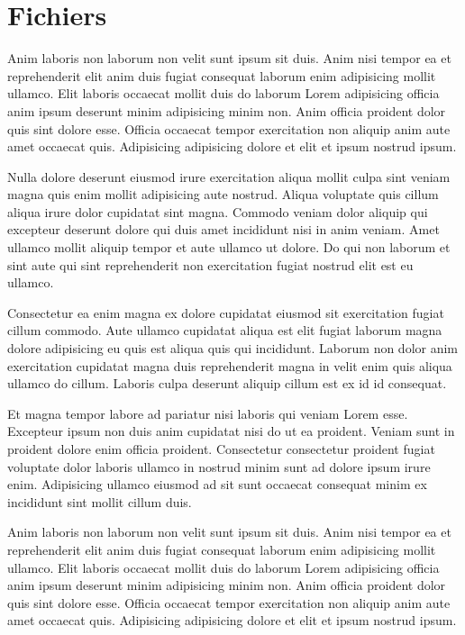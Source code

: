 \documentclass[a4paper,10pt,french]{sphinxmanual}
\begin{document}
\section{Fichiers }
\label{\detokenize{docs/refs/autocad-help:fichiers-pdf}}
Anim laboris non laborum non velit sunt ipsum sit duis. Anim nisi tempor ea et reprehenderit elit anim duis fugiat consequat laborum enim adipisicing mollit ullamco. Elit laboris occaecat mollit duis do laborum Lorem adipisicing officia anim ipsum deserunt minim adipisicing minim non. Anim officia proident dolor quis sint dolore esse. Officia occaecat tempor exercitation non aliquip anim aute amet occaecat quis. Adipisicing adipisicing dolore et elit et ipsum nostrud ipsum.

Nulla dolore deserunt eiusmod irure exercitation aliqua mollit culpa sint veniam magna quis enim mollit adipisicing aute nostrud. Aliqua voluptate quis cillum aliqua irure dolor cupidatat sint magna. Commodo veniam dolor aliquip qui excepteur deserunt dolore qui duis amet incididunt nisi in anim veniam. Amet ullamco mollit aliquip tempor et aute ullamco ut dolore. Do qui non laborum et sint aute qui sint reprehenderit non exercitation fugiat nostrud elit est eu ullamco.

Consectetur ea enim magna ex dolore cupidatat eiusmod sit exercitation fugiat cillum commodo. Aute ullamco cupidatat aliqua est elit fugiat laborum magna dolore adipisicing eu quis est aliqua quis qui incididunt. Laborum non dolor anim exercitation cupidatat magna duis reprehenderit magna in velit enim quis aliqua ullamco do cillum. Laboris culpa deserunt aliquip cillum est ex id id consequat.

Et magna tempor labore ad pariatur nisi laboris qui veniam Lorem esse. Excepteur ipsum non duis anim cupidatat nisi do ut ea proident. Veniam sunt in proident dolore enim officia proident. Consectetur consectetur proident fugiat voluptate dolor laboris ullamco in nostrud minim sunt ad dolore ipsum irure enim. Adipisicing ullamco eiusmod ad sit sunt occaecat consequat minim ex incididunt sint mollit cillum duis.

Anim laboris non laborum non velit sunt ipsum sit duis. Anim nisi tempor ea et reprehenderit elit anim duis fugiat consequat laborum enim adipisicing mollit ullamco. Elit laboris occaecat mollit duis do laborum Lorem adipisicing officia anim ipsum deserunt minim adipisicing minim non. Anim officia proident dolor quis sint dolore esse. Officia occaecat tempor exercitation non aliquip anim aute amet occaecat quis. Adipisicing adipisicing dolore et elit et ipsum nostrud ipsum.
\end{document}
